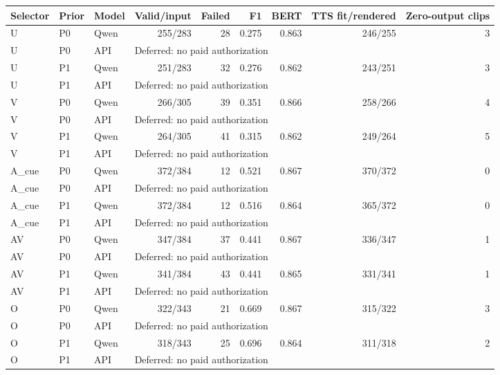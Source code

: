 \begin{tabular}{lllrrrrrr}
\toprule Selector & Prior & Model & Valid/input & Failed & F1 & BERT & TTS fit/rendered & Zero-output clips \\
\midrule
U & P0 & Qwen & 255/283 & 28 & 0.275 & 0.863 & 246/255 & 3 \\
U & P0 & API & \multicolumn{6}{l}{Deferred: no paid authorization} \\
U & P1 & Qwen & 251/283 & 32 & 0.276 & 0.862 & 243/251 & 3 \\
U & P1 & API & \multicolumn{6}{l}{Deferred: no paid authorization} \\
V & P0 & Qwen & 266/305 & 39 & 0.351 & 0.866 & 258/266 & 4 \\
V & P0 & API & \multicolumn{6}{l}{Deferred: no paid authorization} \\
V & P1 & Qwen & 264/305 & 41 & 0.315 & 0.862 & 249/264 & 5 \\
V & P1 & API & \multicolumn{6}{l}{Deferred: no paid authorization} \\
A\_cue & P0 & Qwen & 372/384 & 12 & 0.521 & 0.867 & 370/372 & 0 \\
A\_cue & P0 & API & \multicolumn{6}{l}{Deferred: no paid authorization} \\
A\_cue & P1 & Qwen & 372/384 & 12 & 0.516 & 0.864 & 365/372 & 0 \\
A\_cue & P1 & API & \multicolumn{6}{l}{Deferred: no paid authorization} \\
AV & P0 & Qwen & 347/384 & 37 & 0.441 & 0.867 & 336/347 & 1 \\
AV & P0 & API & \multicolumn{6}{l}{Deferred: no paid authorization} \\
AV & P1 & Qwen & 341/384 & 43 & 0.441 & 0.865 & 331/341 & 1 \\
AV & P1 & API & \multicolumn{6}{l}{Deferred: no paid authorization} \\
O & P0 & Qwen & 322/343 & 21 & 0.669 & 0.867 & 315/322 & 3 \\
O & P0 & API & \multicolumn{6}{l}{Deferred: no paid authorization} \\
O & P1 & Qwen & 318/343 & 25 & 0.696 & 0.864 & 311/318 & 2 \\
O & P1 & API & \multicolumn{6}{l}{Deferred: no paid authorization} \\
\bottomrule
\end{tabular}
